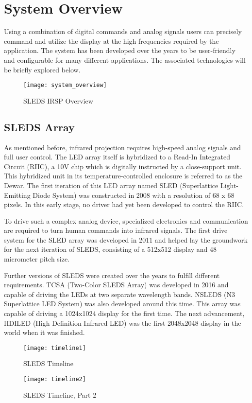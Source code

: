 %
%
\chapter{System Overview}
Using a combination of digital commands and analog signals users can precisely command and utilize the display at the high frequencies required by the application. The system has been developed over the years to be user-friendly and configurable for many different applications. The associated technologies will be briefly explored below.
\begin {figure}[h]
\texttt{[image: system\_overview]}
\centering
\caption {SLEDS IRSP Overview}
\centering
\end {figure}


\section{SLEDS Array}
As mentioned before, infrared projection requires high-speed analog signals and full user control. The LED array itself is hybridized to a Read-In Integrated Circuit (RIIC), a 10V chip which is digitally instructed by a close-support unit. This hybridized unit in its temperature-controlled enclosure is referred to as the Dewar. The first iteration of this LED array named SLED (Superlattice Light-Emitting Diode System) was constructed in 2008 with a resolution of 68 x 68 pixels. In this early stage, no driver had yet been developed to control the RIIC. \cite{chris}\par 
To drive such a complex analog device, specialized electronics and communication are required to turn human commands into infrared signals. The first drive system for the SLED array was developed in 2011 and helped lay the groundwork for the next iteration of SLEDS, consisting of a 512x512 display and 48 micrometer pitch size.\cite{chris} \par
Further versions of SLEDS were created over the years to fulfill different requirements. TCSA (Two-Color SLEDS Array) was developed in 2016 and capable of driving the LEDs at two separate wavelength bands. NSLEDS (N3 Superlattice LED System) was also developed around this time. This array was capable of driving a 1024x1024 display for the first time. The next advancement, HDILED (High-Definition Infrared LED) was the first 2048x2048 display in the world when it was finished. \par
\begin {figure}[h]
\texttt{[image: timeline1]}
\centering
\caption {SLEDS Timeline}
\centering
\end {figure}
\begin {figure}[h]
\texttt{[image: timeline2]}
\centering
\caption {SLEDS Timeline, Part 2}
\centering
\end {figure}

